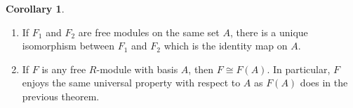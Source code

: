 \documentclass[10pt]{article}
\theoremstyle{definition}
\newtheorem*{cor}{Corollary}
\newcommand{\nl}{\vspace{7em}}
\begin{document}
\nl

\begin{cor}\nl
\begin{enumerate}
\item If $F_1$ and $F_2$ are free modules on the same set $A$, there is a unique isomorphism between $F_1$ and $F_2$ which is the identity map on $A$.
\item If $F$ is any free $R$-module with basis $A$, then $F\cong F(A)$. In particular, $F$ enjoys the same universal property with respect to $A$ as $F(A)$ does in the previous theorem.
\end{enumerate}
\end{cor}
\end{document}
